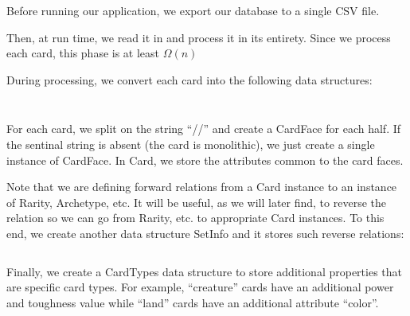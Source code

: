\documentclass[12pt, letterpaper]{article}
\begin{document}
Before running our application,
we export our database to a single CSV file.

Then, at run time,
we read it in and process it in its entirety.
Since we process each card,
this phase is at least $ \Omega(n) $

During processing,
we convert each card into the following data structures:

\inputminted[firstline=161, lastline=165]{python}{../src/algorithm.py}

\inputminted[firstline=168, lastline=175]{python}{../src/algorithm.py}

For each card,
we split on the string \enquote{//} and create a CardFace for each half.
If the sentinal string is absent (the card is monolithic),
we just create a single instance of CardFace.
In Card,
we store the attributes common to the card faces.

Note that we are defining forward relations from a Card instance
to an instance of Rarity, Archetype, etc.
It will be useful, as we will later find,
to reverse the relation so we can go from Rarity, etc. to appropriate Card instances.
To this end,
we create another data structure SetInfo and it stores such reverse relations:

\inputminted[firstline=188, lastline=194]{python}{../src/algorithm.py}

Finally,
we create a CardTypes data structure to store additional properties that are
specific card types.
For example,
\enquote{creature} cards have an additional power and toughness value
while \enquote{land} cards have an additional attribute \enquote{color}.

\inputminted[firstline=178, lastline=185]{python}{../src/algorithm.py}

\inputminted[firstline=122, lastline=151]{python}{../src/algorithm.py}



\end{document}
